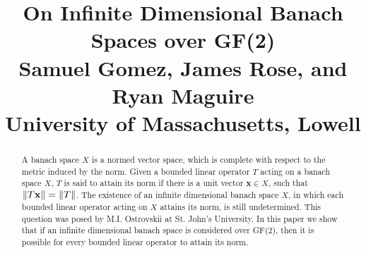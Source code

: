 \documentclass{article}
\title{%
    \normalsize{\textbf{On Infinite Dimensional Banach Spaces over GF(2)}}\\[1em]
    \normalsize{Samuel Gomez, James Rose, and Ryan Maguire}\\[0.2em]
    \normalsize{University of Massachusetts, Lowell}
}
\date{\vspace{-5em}}
\author{\vspace{-5em}}
\theoremstyle{plain}
\DeclarePairedDelimiter\norm{\lVert}{\rVert}
\begin{document}
    \begingroup
    \let\center\flushleft
    \let\endcenter\endflushleft
    \maketitle
    \endgroup
    \vspace{4mm}
    \begin{abstract}
        A banach space $X$ is a normed vector space, which is complete with respect
        to the metric induced by the norm. Given a bounded linear operator $T$ acting
        on a banach space $X$, $T$ is said to attain its norm if there is a unit
        vector $\mathbf{x}\in{X}$, such that $\norm{T\mathbf{x}}=\norm{T}$. The existence
        of an infinite dimensional banach space $X$, in which each
        bounded linear operator acting on $X$ attains its norm, is still undetermined.
        This question was posed by M.I. Ostrovskii at St. John's University. In this
        paper we show that if an infinite dimensional banach space is considered
        over GF(2), then it is possible for every bounded
        linear operator to attain its norm.
    \end{abstract}
\end{document}
